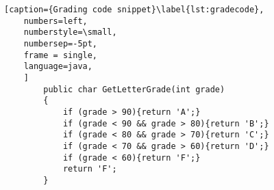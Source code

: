 \begin{lstlisting}[caption={Grading code snippet}\label{lst:gradecode},
    numbers=left, 
    numberstyle=\small, 
    numbersep=-5pt, 
    frame = single, 
    language=java, 
    ]
        public char GetLetterGrade(int grade) 
        {
            if (grade > 90){return 'A';}
            if (grade < 90 && grade > 80){return 'B';}
            if (grade < 80 && grade > 70){return 'C';}
            if (grade < 70 && grade > 60){return 'D';}
            if (grade < 60){return 'F';}
            return 'F';
        }
        
    \end{lstlisting}